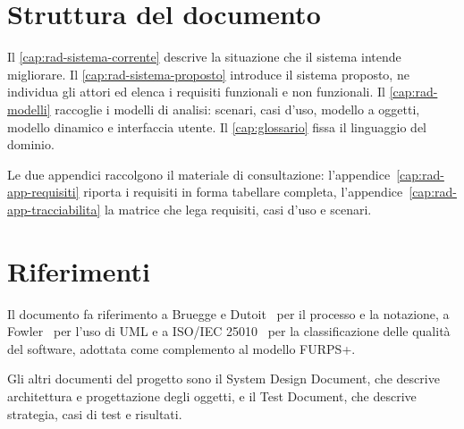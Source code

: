 \section{Struttura del documento}

Il \cref{cap:rad-sistema-corrente} descrive la situazione che il sistema
intende migliorare. Il \cref{cap:rad-sistema-proposto} introduce il sistema
proposto, ne individua gli attori ed elenca i requisiti funzionali e non
funzionali. Il \cref{cap:rad-modelli} raccoglie i modelli di analisi:
scenari, casi d'uso, modello a oggetti, modello dinamico e interfaccia
utente. Il \cref{cap:glossario} fissa il linguaggio del dominio.

Le due appendici raccolgono il materiale di consultazione:
l'appendice~\ref{cap:rad-app-requisiti} riporta i requisiti in forma tabellare
completa, l'appendice~\ref{cap:rad-app-tracciabilita} la matrice che lega requisiti,
casi d'uso e scenari.

\section{Riferimenti}

Il documento fa riferimento a Bruegge e Dutoit~\cite{bruegge2010} per il
processo e la notazione, a Fowler~\cite{fowler2003} per l'uso di UML e a
ISO/IEC 25010~\cite{iso25010} per la classificazione delle qualità del
software, adottata come complemento al modello FURPS+.

Gli altri documenti del progetto sono il System Design Document, che descrive
architettura e progettazione degli oggetti, e il Test Document, che descrive
strategia, casi di test e risultati.
